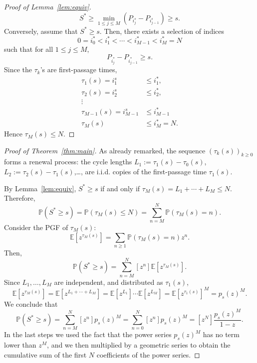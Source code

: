 \documentclass[a4paper,reqno,11pt]{amsart}
\numberwithin{equation}{section}
\def\EE{{\mathbb E}}
\def\PP{{\mathbb P}}
\numberwithin{thm}{section}
\theoremstyle{plain}
\theoremstyle{definition}
\begin{document}
{\begin{proof}[Proof of Lemma~\ref{lem:equiv}]
$$
S^*\geq \min_{1\leq j\leq M}(P_{i^s_{j}}-P_{i^s_{j-1}})\geq s.
$$
Conversely, assume that $S^*\geq s$. Then, there exists a selection of indices
$$0=i^*_0< i^*_1<\cdots<i^*_{M-1}<i^*_M=N$$
such that for all $1\leq j\leq M$,
$$
P_{i^*_{j}}-P_{i^*_{j-1}}\geq s.
$$
Since the $\tau_k$'s are first-passage times, 
    \begin{equation*}
\begin{aligned}
\tau_1(s)=i^s_1&\leq i^*_1,\\ 
 \tau_2(s)=i^s_2&\leq i^*_2,\\
   \vdots &\\
   \tau_{M-1}(s)=i^s_{M-1}&\leq i^*_{M-1}\\
   \tau_M(s)&\leq i^*_M=N. 
\end{aligned}    
    \end{equation*}
Hence $\tau_M(s)\leq N$.
\end{proof}
 


\begin{proof}[Proof of Theorem~\ref{thm:main}] 
As already remarked, the sequence $(\tau_k(s))_{k\geq 0}$ forms a renewal process: the cycle lengths $L_1:=\tau_1(s)-\tau_0(s) $, $L_2:=\tau_2(s)-\tau_1(s)$,\ldots, are i.i.d. copies of the first-passage time $\tau_1(s)$. 

By Lemma~\ref{lem:equiv}, $S^*\geq s$ if and only if $\tau_M(s)=L_1+\cdots+L_M\leq N$. 
Therefore,
\begin{equation}
\PP\left(S^*\geq s\right)=\PP\left(\tau_M(s)\leq N\right)=\sum_{n=M}^N \PP\left(\tau_M(s)=n\right).
\end{equation}
Consider the PGF of $\tau_M(s)$:
\begin{equation}
\EE[z^{\tau_M(s)}]=\sum_{n\geq1}\PP\left(\tau_M(s)=n\right)z^n. 
\end{equation}
Then,
\begin{equation}
   \PP\left(S^*\geq s\right)=\sum_{n=M}^N[z^n] \EE[z^{\tau_M(s)}].
\end{equation}
Since $L_1,\ldots,L_M$ are independent, and distributed as $\tau_1(s)$,
\begin{equation}
    \EE[z^{\tau_M(s)}]=   \EE[z^{L_1+\cdots+L_M}]=\EE[z^{L_1}]\cdots\EE[z^{L_M}]=\EE[z^{\tau_1(s)}]^M=p_s(z)^M.
\end{equation} 
We conclude that
\begin{equation}
   \PP\left(S^*\geq s\right)=\sum_{n=M}^N[z^n] p_s(z)^M=\sum_{n=0}^N[z^n] p_s(z)^M=[z^N]\frac{p_s(z)^M}{1-z}.
\end{equation}
In the last steps we used the fact that the power series $p_s(z)^M$ has no term lower than $z^M$, and we then multiplied by a geometric series to obtain the cumulative sum of the first $N$ coefficients of the power series.
\end{proof}

}
\end{document}
